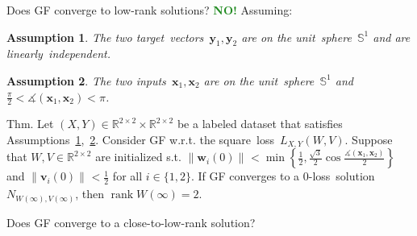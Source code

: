 \documentclass[handout,usenames,dvipsnames]{beamer} %
\DeclareMathOperator{\rank}{rank}
\newtheorem{assumption}{Assumption}
\newcommand{\norm}[2][]{{\left\|{#2}\right\|_{#1}}}
\newcommand{\bx}{\mathbf{x}}
\newcommand{\bw}{\mathbf{w}}
\newcommand{\bv}{\mathbf{v}}
\newcommand{\by}{\mathbf{y}}
\newcommand{\reals}{{\mathbb R}}
\newcommand{\true}[1]{{\textcolor{ForestGreen}{\textbf{#1}}}}
\begin{document}
\begin{frame}
    Does GF converge to low-rank solutions? \true{NO!}
    Assuming:
    \pause
    \begin{assumption}\label{assumption:ys_linearly_independent}
        The two target~vectors~$\by_1, \by_2$ are on the unit~sphere~$\mathbb{S}^1$ and are linearly~independent.
    \end{assumption}
    \pause
    \begin{assumption}\label{assumption:xs_bounded_angle}
        The two inputs~$\bx_1, \bx_2$ are on the unit~sphere~$\mathbb{S}^1$ and $\frac{\pi}{2} < \measuredangle(\bx_1, \bx_2) < \pi$.
    \end{assumption}
    \pause
    \begin{exampleblock}{Thm. \hfill\checkmark}\label{T2}
        Let $(X,Y) \in \mathbb{R}^{2 \times 2} \times \mathbb{R}^{2 \times 2}$ be a labeled dataset that satisfies Assumptions~\ref{assumption:ys_linearly_independent},~\ref{assumption:xs_bounded_angle}.
        Consider GF w.r.t. the square~loss~$L_{X,Y}(W,V)$. Suppose that $W,V \in \reals^{2 \times 2}$ are initialized s.t. 
        $\norm{\bw_i(0)} < \min \left\{ \frac{1}{2}, \frac{\sqrt{3}}{2} \cos{\frac{\measuredangle(\bx_1, \bx_2)}{2}} \right\}$ 
        and $\norm{\bv_i(0)} < \frac{1}{2}$ for all $i \in \{1,2\}$. If GF converges to a $0$-loss~solution~$N_{W(\infty),V(\infty)}$, then $\rank W(\infty) = 2$.
    \end{exampleblock}
    \pause
    Does GF converge to a \alert{close-to-low-rank} solution?
    

\end{frame}
\end{document}
